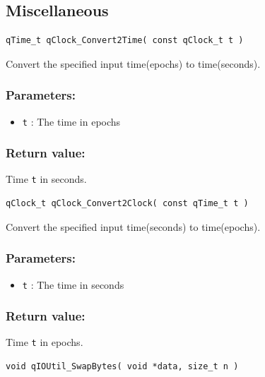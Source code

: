 \documentclass{article}
\begin{document}
\subsection{Miscellaneous}

\begin{lstlisting}[style=CStyle]
qTime_t qClock_Convert2Time( const qClock_t t )
\end{lstlisting}

Convert the specified input time(epochs) to time(seconds). 

\subsubsection*{Parameters:}
\begin{itemize}
    \item \lstinline{t} : The time in epochs
\end{itemize}

\subsubsection*{Return value:}
Time \lstinline{t} in seconds.
 
\noindent\hrulefill

\begin{lstlisting}[style=CStyle]
qClock_t qClock_Convert2Clock( const qTime_t t )
\end{lstlisting}

Convert the specified input time(seconds) to time(epochs). 

\subsubsection*{Parameters:}
\begin{itemize}
    \item \lstinline{t} : The time in seconds
\end{itemize}

\subsubsection*{Return value:}
 Time \lstinline{t} in epochs.

\noindent\hrulefill

\begin{lstlisting}[style=CStyle]
void qIOUtil_SwapBytes( void *data, size_t n )
\end{lstlisting}
\end{document}
